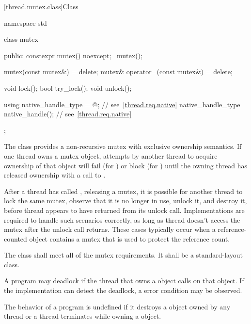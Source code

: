 [thread.mutex.class]{Class }

%
\begin{codeblock}
namespace std {
  class mutex {
  public:
    constexpr mutex() noexcept;
    ~mutex();

    mutex(const mutex&) = delete;
    mutex& operator=(const mutex&) = delete;

    void lock();
    bool try_lock();
    void unlock();

    using native_handle_type = @\impdefnc@;          // see~\ref{thread.req.native}
    native_handle_type native_handle();                         // see~\ref{thread.req.native}
  };
}
\end{codeblock}

\pnum
The class  provides a non-recursive mutex with exclusive ownership
semantics. If one thread owns a mutex object, attempts by another thread to acquire
ownership of that object will fail (for ) or block (for
) until the owning thread has released ownership with a call to
.

\pnum
\begin{note}
After a thread  has called , releasing a mutex, it is possible for another
thread  to lock the same mutex, observe that it is no longer in use, unlock it, and
destroy it, before thread  appears to have returned from its unlock call. Implementations
are required to handle such scenarios correctly, as long as thread  doesn't access the
mutex after the unlock call returns. These cases typically occur when a reference-counted object
contains a mutex that is used to protect the reference count.
\end{note}

\pnum
The class  shall meet all of the mutex
requirements. It shall be a standard-layout
class.

\pnum
\begin{note}
A program may deadlock if the thread that owns a  object calls
 on that object. If the implementation can detect the deadlock,
a  error condition may be observed.
\end{note}

\pnum
The behavior of a program is undefined if
it destroys a  object owned by any thread or
a thread terminates while owning a  object.

